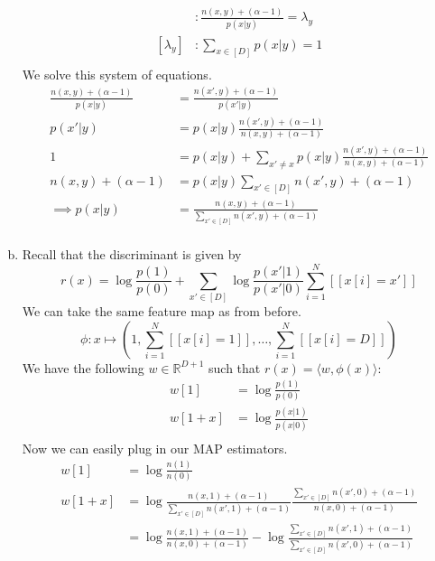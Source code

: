 \documentclass{amsart}
\newcommand{\rr}{\mathbb{R}}    %
\theoremstyle{definition}
\begin{document}
\begin{enumerate}[(a)]
		\begin{align*}
			[p(x|y)] &: \frac{n(x,y) + (\alpha - 1)}{p(x|y)} = \lambda_y\\
			[\lambda_y] &: \sum_{x \in [D]} p(x|y) = 1\\
		\end{align*}
		We solve this system of equations.
		\begin{align*}
			\frac{n(x,y) + (\alpha - 1)}{p(x|y)} &= \frac{n(x',y) + (\alpha - 1)}{p(x'|y)}\\
			p(x'|y) &= p(x|y)\frac{n(x',y) + (\alpha - 1)}{n(x,y) + (\alpha - 1)}\\
			1 &= p(x|y) + \sum_{x' \neq x} p(x|y)\frac{n(x',y) + (\alpha - 1)}{n(x,y) + (\alpha - 1)}\\
			n(x,y) + (\alpha - 1) &= p(x|y)\sum_{x' \in [D]} n(x',y) + (\alpha - 1)\\
			\implies p(x|y) &= \frac{n(x,y) + (\alpha - 1)}{\sum_{x'\in [D]} n(x',y) + (\alpha - 1)}\\
		\end{align*}
	\item
		Recall that the discriminant is given by 
		\[r(x) = \log\frac{p(1)}{p(0)} + \sum_{x' \in [D]} \log \frac{p(x'|1)}{p(x'|0)}\sum_{i=1}^{N} [[x[i] = x']]\]
		We can take the same feature map as from before.
		\[\phi: x\mapsto \left(1, \sum_{i=1}^{N} [[x[i] = 1]], \ldots, \sum_{i =1}^{N} [[x[i] = D]]\right)\]
		We have the following $w \in \rr^{D+1}$ such that $r(x) = \langle w, \phi(x)\rangle$:
		\begin{align*}
			w[1] &= \log\frac{p(1)}{p(0)}\\
			w[1 + x] &= \log\frac{p(x|1)}{p(x|0)}\\
		\end{align*}
		Now we can easily plug in our MAP estimators. 
		\begin{align*}
			w[1] &= \log\frac{n(1)}{n(0)}\\
			w[1 + x] &= \log\frac{n(x, 1) + (\alpha - 1)}{\sum_{x'\in [D]} n(x', 1) + (\alpha - 1)}\frac{\sum_{x' \in [D]} n(x', 0) + (\alpha - 1)}{n(x,0) + (\alpha - 1)}\\
			&= \log\frac{n(x, 1) + (\alpha - 1)}{n(x,0) + (\alpha - 1)} - \log\frac{\sum_{x' \in [D]} n(x', 1) + (\alpha - 1)}{\sum_{x' \in [D]} n(x', 0) + (\alpha - 1)}\\
		\end{align*}
\end{enumerate}
\end{document}
